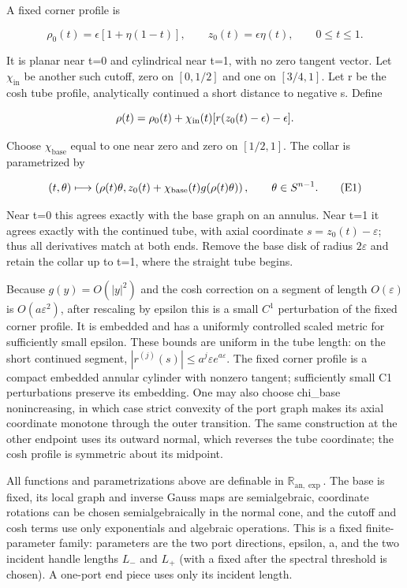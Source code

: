 \documentclass[11pt,a4paper]{article}
\begin{document}
A fixed corner profile is

\[
 \rho_0(t)=\epsilon[1+\eta(1-t)],\qquad
 z_0(t)=\epsilon\eta(t),\qquad 0\le t\le1.
\]

It is planar near t=0 and cylindrical near t=1, with no zero tangent
vector. Let \(\chi_{\mathrm{in}}\) be another such cutoff, zero on
\([0,1/2]\) and one on \([3/4,1]\). Let r be the cosh tube profile,
analytically continued a short distance to negative s. Define

\[
 \rho(t)=\rho_0(t)+\chi_{\rm in}(t)[r(z_0(t)-\epsilon)-\epsilon].
\]

Choose \(\chi_{\mathrm{base}}\) equal to one near zero and zero on
\([1/2,1]\). The collar is parametrized by

\[
 (t,\theta)\longmapsto
 \left(\rho(t)\theta,
       z_0(t)+\chi_{\rm base}(t)g(\rho(t)\theta)\right),
 \qquad\theta\in S^{n-1}.
 \tag{E1}
\]

Near t=0 this agrees exactly with the base graph on an annulus. Near t=1
it agrees exactly with the continued tube, with axial coordinate
\(s=z_0(t)-\varepsilon\); thus all derivatives match at both ends.
Remove the base disk of radius \(2\varepsilon\) and retain the collar up
to t=1, where the straight tube begins.

Because \(g(y)=O(|y|^2)\) and the cosh correction on a segment of length
\(O(\varepsilon )\) is \(O(a \varepsilon ^2)\), after rescaling by
epsilon this is a small \(C^1\) perturbation of the fixed corner
profile. It is embedded and has a uniformly controlled scaled metric for
sufficiently small epsilon. These bounds are uniform in the tube length:
on the short continued segment,
\(|r^{(j)}(s)|\le a^j\varepsilon e^{a\varepsilon}\). The fixed corner
profile is a compact embedded annular cylinder with nonzero tangent;
sufficiently small C1 perturbations preserve its embedding. One may also
choose chi\_base nonincreasing, in which case strict convexity of the
port graph makes its axial coordinate monotone through the outer
transition. The same construction at the other endpoint uses its outward
normal, which reverses the tube coordinate; the cosh profile is
symmetric about its midpoint.

All functions and parametrizations above are definable in
\(\mathbb R_{\mathrm{an},\exp}\). The base is fixed, its local graph and
inverse Gauss maps are semialgebraic, coordinate rotations can be chosen
semialgebraically in the normal cone, and the cutoff and cosh terms use
only exponentials and algebraic operations. This is a fixed
finite-parameter family: parameters are the two port directions,
epsilon, a, and the two incident handle lengths \(L_-\) and \(L_+\)
(with a fixed after the spectral threshold is chosen). A one-port end
piece uses only its incident length.
\end{document}

